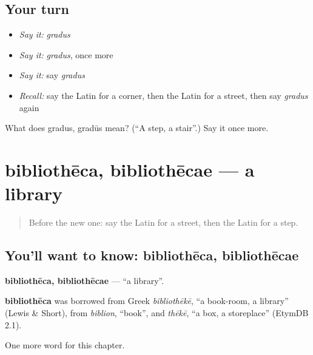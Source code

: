 \subsection*{Your turn}
\begin{itemize}
\raggedright
  \item \emph{Say it:} \emph{gradus}
  \item \emph{Say it:} \emph{gradus}, once more
  \item \emph{Say it:} say \emph{gradus}
  \item \emph{Recall:} say the Latin for a corner, then the Latin for a street, then say \emph{gradus} again
\end{itemize}

\begin{tcolorbox}[breakable,colback=teal!4,colframe=teal!35!black,title={Before you move on}]
What does gradus, gradūs mean? (\textquotedblleft{}A step, a stair\textquotedblright{}.) Say it once more.
\end{tcolorbox}
\section[bibliothēca, bibliothēcae]{bibliothēca, bibliothēcae — a library}

\label{lesson:LA-C117-bibliotheca}



\begin{quote}
Before the new one: say the Latin for a street, then the Latin for a step.
\end{quote}

\subsection*{You'll want to know: bibliothēca, bibliothēcae}
\textbf{bibliothēca, bibliothēcae} — \textquotedblleft{}a library\textquotedblright{}.

\begin{cousinweb}
\textbf{bibliothēca} was borrowed from Greek \emph{bibliothēkē}, \textquotedblleft{}a book-room, a library\textquotedblright{} (Lewis \& Short), from \emph{biblion}, \textquotedblleft{}book\textquotedblright{}, and \emph{thēkē}, \textquotedblleft{}a box, a storeplace\textquotedblright{} (EtymDB 2.1).
\end{cousinweb}

\begin{grammarlens}[title={What you've built}]
One more word for this chapter.
\end{grammarlens}


